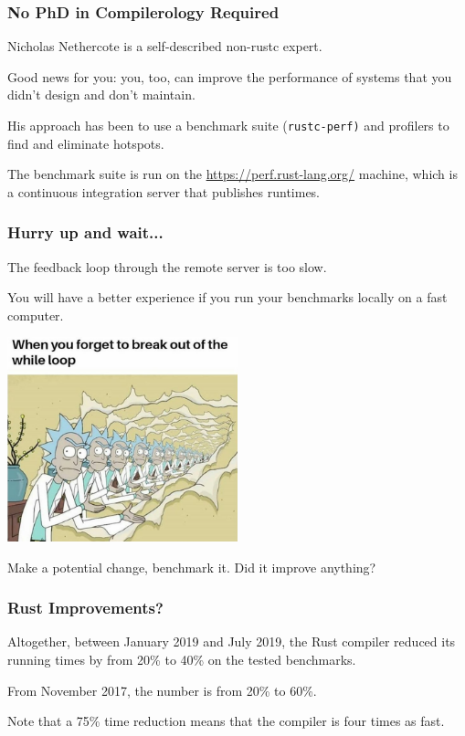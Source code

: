 \begin{frame}
\frametitle{No PhD in Compilerology Required}

Nicholas Nethercote is a self-described non-rustc expert. 

Good news for you: you, too, can improve the performance of systems that you didn't design and don't maintain. 

His approach has been to use a benchmark suite (\texttt{rustc-perf)}
and profilers to find and eliminate hotspots.

The benchmark suite is run on the \url{https://perf.rust-lang.org/} machine, which is a continuous integration server that publishes runtimes.

\end{frame}


\begin{frame}
\frametitle{Hurry up and wait...}

The feedback loop through the remote server is too slow. 

You will have a better experience if you run your benchmarks locally on a
fast computer.

\begin{center}
	\includegraphics[width=0.5\textwidth]{images/loop.png}
\end{center}

Make a potential change, benchmark it. Did it improve anything? 

\end{frame}

\begin{frame}
\frametitle{Rust Improvements?}

Altogether, between January 2019 and July 2019, the Rust compiler reduced
its running times by from 20\% to 40\% on the tested benchmarks.

From November 2017,
the number is from 20\% to 60\%. 

Note that a 75\% time reduction means that the compiler is four times as fast.

\end{frame}



